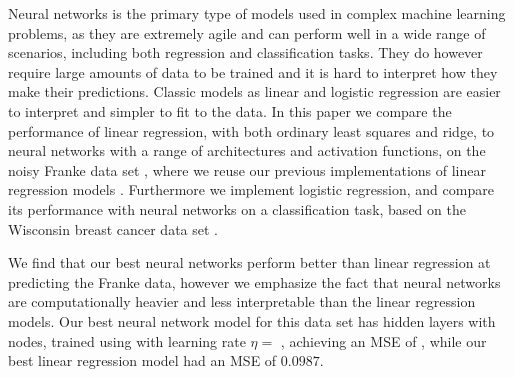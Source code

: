 Neural networks is the primary type of models used in complex machine learning problems, as they are extremely agile and can perform well in a wide range of scenarios, including both regression and classification tasks.
They do however require large amounts of data to be trained and it is hard to interpret how they make their predictions.
Classic models as linear and logistic regression are easier to interpret and simpler to fit to the data.
In this paper we compare the performance of linear regression, with both ordinary least squares and ridge, to neural networks with a range of architectures and activation functions, on the noisy Franke data set \cite{frank}, where we reuse our previous implementations of linear regression models \cite{project1}.
Furthermore we implement logistic regression, and compare its performance with neural networks on a classification task, based on the Wisconsin breast cancer data set \cite{breast_cancer_wisconsin}.

We find that our best neural networks perform better than linear regression at predicting the Franke data, however we emphasize the fact that neural networks are computationally heavier and less interpretable than the linear regression models.
Our best neural network model for this data set has  hidden layers with  nodes, trained using  with learning rate $\eta =$ , achieving an MSE of , while our best linear regression model had an MSE of $0.0987$.

